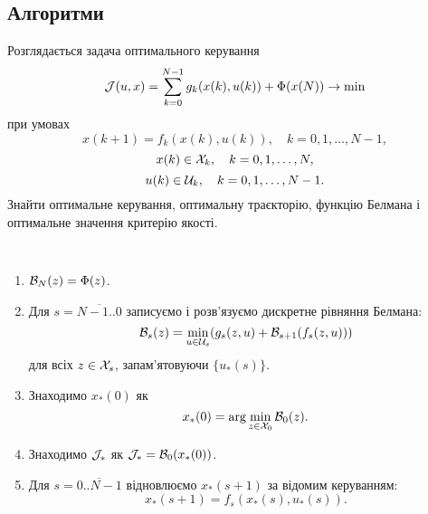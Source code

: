 \subsection{Алгоритми}

\begin{problem*}
	Розглядається задача оптимального керування \[ \mathcal{J} (u, x) = \sum_{k=0}^{N-1} g_k(x(k),u(k))+\Phi(x(N))\to\min \] при умовах \[ x(k + 1) = f_k(x(k),u(k)), \quad k=0,1,\ldots,N-1, \] \[ x(k)\in\mathcal{X}_k, \quad k=0,1,\ldots,N, \] \[ u(k)\in\mathcal{U}_k, \quad k=0,1,\ldots,N-1. \] Знайти оптимальне керування, оптимальну траєкторію, функцію Белмана і оптимальне значення критерію якості.
\end{problem*}

\begin{algorithm} \tt
	\begin{enumerate}
		\item $\mathcal{B}_N(z) = \Phi(z)$.
		\item Для $s=\overline{N-1..0}$ записуємо і розв'язуємо дискретне рівняння Белмана: \[\mathcal{B}_s(z) = \min_{u\in \mathcal{U}_s} (g_s(z,u)+\mathcal{B}_{s+1}(f_s(z,u))) \] для всіх $z \in \mathcal{X}_s$, запам'ятовуючи $\{u_*(s)\}$.
		\item Знаходимо $x_*(0)$ як \[ x_*(0) = \arg\min_{z\in \mathcal{X}_0} \mathcal{B}_0(z).\]
		\item Знаходимо $\mathcal{J}_*$ як $\mathcal{J}_* = \mathcal{B}_0(x_*(0))$.
		\item Для $s=\overline{0..N-1}$ відновлюємо $x_*(s+1)$ за відомим керуванням: \[x_*(s+1) = f_s(x_*(s),u_*(s)).\] 
	\end{enumerate}
\end{algorithm}